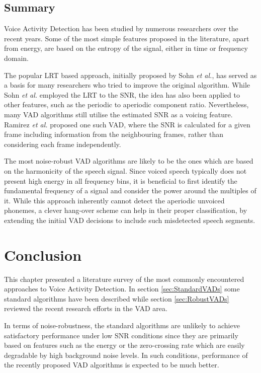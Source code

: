 \subsection{Summary}

Voice Activity Detection has been studied by numerous researchers over the recent years. Some of the most simple features proposed in the literature, apart from energy, are based on the entropy of the signal, either in time or frequency domain.

The popular LRT based approach, initially proposed by Sohn \emph{et al.}, has served as a basis for many researchers who tried to improve the original algorithm. While Sohn \emph{et al.} employed the LRT to the SNR, the idea has also been applied to other features, such as the periodic to aperiodic component ratio. Nevertheless, many VAD algorithms still utilise the estimated SNR as a voicing feature. Ramirez \emph{et al.} proposed one such VAD, where the SNR is calculated for a given frame including information from the neighbouring frames, rather than considering each frame independently.

The most noise-robust VAD algorithms are likely to be the ones which are based on the harmonicity of the speech signal. Since voiced speech typically does not present high energy in all frequency bins, it is beneficial to first identify the fundamental frequency of a signal and consider the power around the multiples of it. While this approach inherently cannot detect the aperiodic unvoiced phonemes, a clever hang-over scheme can help in their proper classification, by extending the initial VAD decisions to include such misdetected speech segments.


\section{Conclusion}

This chapter presented a literature survey of the most commonly encountered approaches to Voice Activity Detection. In section \ref{sec:StandardVADs} some standard algorithms have been described while section \ref{sec:RobustVADs} reviewed the recent research efforts in the VAD area.

In terms of noise-robustness, the standard algorithms are unlikely to achieve satisfactory performance under low SNR conditions since they are primarily based on features such as the energy or the zero-crossing rate which are easily degradable by high background noise levels. In such conditions, performance of the recently proposed VAD algorithms is expected to be much better.